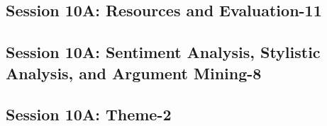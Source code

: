 \subsection{\large Session 10A: Resources and Evaluation-11}
\label{parallel-session-10A-trackE}
\TrackELoc\hfill\sessionchair{}{}
\clearpage
\subsection{\large Session 10A: Sentiment Analysis, Stylistic Analysis, and Argument Mining-8}
\label{parallel-session-10A-trackF}
\TrackFLoc\hfill\sessionchair{}{}
\clearpage
\subsection{\large Session 10A: Theme-2}
\label{parallel-session-10A-trackG}
\TrackGLoc\hfill\sessionchair{}{}
\clearpage


